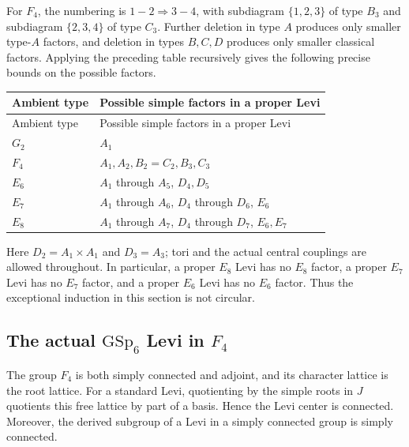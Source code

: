 \documentclass[11pt,a4paper]{article}
\theoremstyle{definition}
\theoremstyle{remark}
\begin{document}
For \(F_4\), the numbering is \(1-2\Rightarrow3-4\), with subdiagram
\(\{1,2,3\}\) of type \(B_3\) and subdiagram \(\{2,3,4\}\) of type \(C_3\).
Further deletion in type \(A\) produces only smaller type-\(A\) factors,
and deletion in types \(B,C,D\) produces only smaller classical factors.
Applying the preceding table recursively gives the following precise
bounds on the possible factors.

\begin{longtable}{@{}ll@{}}
\toprule
Ambient type & Possible simple factors in a proper Levi\\
\midrule
\endfirsthead
\toprule
Ambient type & Possible simple factors in a proper Levi\\
\midrule
\endhead
\(G_2\) & \(A_1\)\\
\(F_4\) & \(A_1,A_2,B_2=C_2,B_3,C_3\)\\
\(E_6\) & \(A_1\) through \(A_5\), \(D_4,D_5\)\\
\(E_7\) & \(A_1\) through \(A_6\), \(D_4\) through \(D_6\), \(E_6\)\\
\(E_8\) & \(A_1\) through \(A_7\), \(D_4\) through \(D_7\), \(E_6,E_7\)\\
\bottomrule
\end{longtable}

Here \(D_2=A_1\times A_1\) and \(D_3=A_3\); tori and the actual central
couplings are allowed throughout.
In particular, a proper \(E_8\) Levi has no \(E_8\) factor, a proper
\(E_7\) Levi has no \(E_7\) factor, and a proper \(E_6\) Levi has no
\(E_6\) factor.
Thus the exceptional induction in this section is not circular.

\subsection{The actual \(\mathrm{GSp}_6\) Levi in \(F_4\)}
\label{subsec:ex-f4-gsp}

The group \(F_4\) is both simply connected and adjoint, and its character
lattice is the root lattice.
For a standard Levi, quotienting by the simple roots in \(J\) quotients
this free lattice by part of a basis. Hence the Levi center is connected.
Moreover, the derived subgroup of a Levi in a simply connected group is
simply connected.
\end{document}
